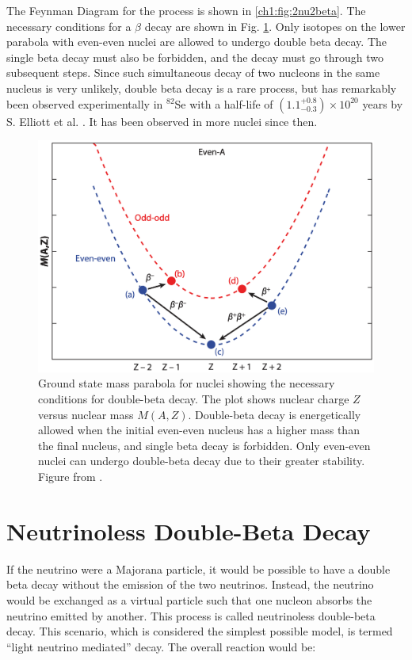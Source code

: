 

The Feynman Diagram for the process is shown in \ref{ch1:fig:2nu2beta}. The necessary conditions for a $\beta$ decay are shown in Fig. \ref{2nbb_cond}. Only isotopes on the lower parabola with even-even nuclei are allowed to undergo double beta decay. The single beta decay must also be forbidden, and the decay must go through two subsequent steps. Since such simultaneous decay of two nucleons in the same nucleus is very unlikely, double beta decay is a rare process, but has remarkably been observed experimentally in $^{82}$Se with a half-life of $(1.1^{+0.8}_{-0.3})\times 10^{20}$ years by S. Elliott et al. \cite{PhysRevLett.59.2020}. It has been observed in more nuclei since then.

\begin{figure}[!htb]
\centering
\includegraphics[width=0.8\linewidth]{ch1/figs/2nbb_cond.png}
\caption{Ground state mass parabola for nuclei showing the necessary conditions for double-beta decay. The plot shows nuclear charge \(Z\) versus nuclear mass \(M(A,Z)\). Double-beta decay is energetically allowed when the initial even-even nucleus has a higher mass than the final nucleus, and single beta decay is forbidden. Only even-even nuclei can undergo double-beta decay due to their greater stability. Figure from \cite{2nbb_cond}.}
\label{2nbb_cond}

\end{figure}

\section{Neutrinoless Double-Beta Decay}
If the neutrino were a Majorana particle, it would be possible to have a double beta decay without the emission of the two neutrinos. Instead, the neutrino would be exchanged as a virtual particle such that one nucleon absorbs the neutrino emitted by another. This process is called neutrinoless double-beta decay. This scenario, which is considered the simplest possible model, is termed ``light neutrino mediated'' decay. The overall reaction would be:

